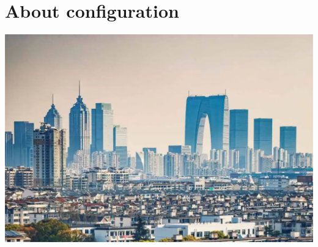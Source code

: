 \chapter{About configuration}
\hypertarget{index}{}\label{index}
\label{index_md_doc_2about}%
%
  
\begin{DoxyImageNoCaption}
  \mbox{\includegraphics[width=\textwidth,height=\textheight/2,keepaspectratio=true]{about.png}}
\end{DoxyImageNoCaption}
    